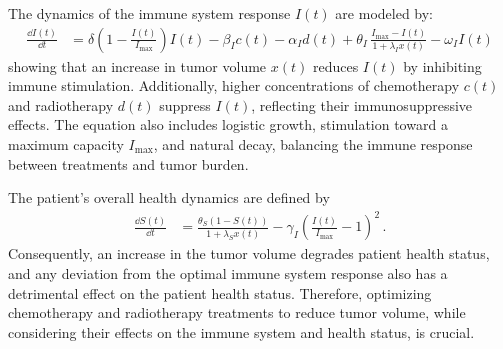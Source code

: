 \documentclass[preprint,12pt]{elsarticle}
\begin{document}
The dynamics of the immune system response \( I(t) \) are modeled by:
\begin{align}
\frac{\dd I(t)}{\dd t} &= \delta \left(1 - \frac{I(t)}{I_{\text{max}}}\right) I(t) - \beta_I c(t) - \alpha_I d(t) + 
\theta_I \, \frac{I_{\text{max}} - I(t)}{1 + \lambda_I x(t)} - \omega_I I(t) 
\label{eq:immune_eq}
\end{align}
showing that an increase in tumor volume \( x(t) \) reduces \( I(t) \) by inhibiting immune stimulation. Additionally, higher concentrations of chemotherapy \( c(t) \) and radiotherapy \( d(t) \) suppress \( I(t) \), reflecting their immunosuppressive effects. The equation also includes logistic growth, stimulation toward a maximum capacity \( I_{\text{max}} \), and natural decay, balancing the immune response between treatments and tumor burden.
 
The patient's overall health dynamics are defined by
\begin{align}
\frac{\dd S(t)}{\dd t} &= \frac{\theta_S (1 - S(t))}{1 + \lambda_S x(t)} - \gamma_I \left(\frac{I(t)}{I_{\text{max}}} - 1\right)^2 \,.
\label{eq:health_eq}
\end{align} 
Consequently, an increase in the tumor volume degrades patient health status, and any deviation from the optimal immune system response also has a detrimental effect on the patient health status. Therefore, optimizing chemotherapy and radiotherapy treatments to reduce tumor volume, while considering their effects on the immune system and health status, is crucial.
\end{document}
